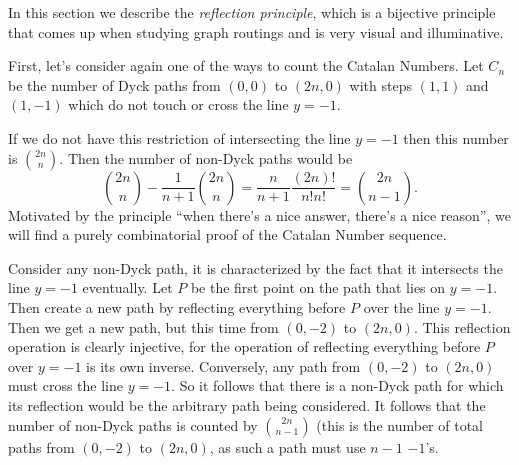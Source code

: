 In this section we describe the \textit{reflection principle}, which is a bijective principle that comes up when studying graph routings and is very visual and illuminative.

First, let's consider again one of the ways to count the Catalan Numbers. Let $C_n$ be the number of Dyck paths from $(0, 0)$ to $(2n, 0)$ with steps $(1, 1)$ and $(1, -1)$ which do not touch or cross the line $y = -1$.

If we do not have this restriction of intersecting the line $y = -1$ then this number is $\binom{2n}{n}$. Then the number of non-Dyck paths would be
\[\binom{2n}{n} - \frac{1}{n+1}\binom{2n}{n} = \frac{n}{n+1}\frac{(2n)!}{n!n!} = \binom{2n}{n-1}.\]
Motivated by the principle ``when there's a nice answer, there's a nice reason'', we will find a purely combinatorial proof of the Catalan Number sequence.

Consider any non-Dyck path, it is characterized by the fact that it intersects the line $y = -1$ eventually. Let $P$ be the first point on the path that lies on $y = -1$. Then create a new path by reflecting everything before $P$ over the line $y = -1$. Then we get a new path, but this time from $(0, -2)$ to $(2n, 0)$. This reflection operation is clearly injective, for the operation of reflecting everything before $P$ over $y = -1$ is its own inverse. Conversely, any path from $(0, -2)$ to $(2n, 0)$ must cross the line $y = -1$. So it follows that there is a non-Dyck path for which its reflection would be the arbitrary path being considered. It follows that the number of non-Dyck paths is counted by $\binom{2n}{n-1}$ (this is the number of total paths from $(0, -2)$ to $(2n, 0)$, as such a path must use $n-1$ $-1$'s.
